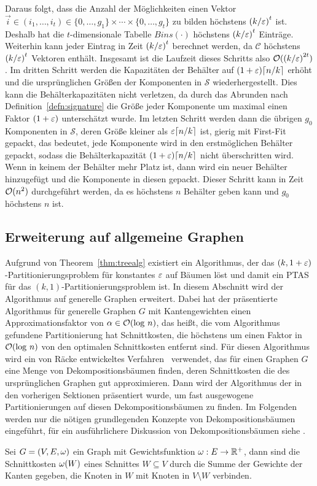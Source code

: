 Daraus folgt, dass die Anzahl der Möglichkeiten einen Vektor $\vec{i} \in (i_1, \ldots, i_t) \in \{0, \ldots, g_1\} \times \cdots \times \{0, \ldots, g_t\}$ zu bilden höchstens ${(k/\varepsilon)}^t$ ist.
Deshalb hat die $t$-dimensionale Tabelle $Bins(\cdot)$ höchstens ${(k/\varepsilon)}^t$ Einträge. 
Weiterhin kann jeder Eintrag in Zeit ${(k/\varepsilon)}^t$ berechnet werden, da $\mathcal{C}$ höchstens ${(k/\varepsilon)}^t$ Vektoren enthält.
Insgesamt ist die Laufzeit dieses Schritts also $\mathcal{O}({(k/\varepsilon)}^{2t})$.
Im dritten Schritt werden die Kapazitäten der Behälter auf $(1 + \eps) \ceil*{n/k}$ erhöht und die ursprünglichen Größen der Komponenten in $\mathcal{S}$ wiederhergestellt.
Dies kann die Behälterkapazitäten nicht verletzen, da durch das Abrunden nach Definition~\ref{defn:signature} die Größe jeder Komponente um maximal  einen Faktor $(1 + \varepsilon)$ unterschätzt wurde.
Im letzten Schritt werden dann die übrigen $g_0$ Komponenten in $\mathcal{S}$, deren Größe kleiner als $\eps \ceil*{n/k}$ ist, gierig mit First-Fit gepackt, das bedeutet, jede Komponente wird in den erstmöglichen Behälter gepackt, sodass die Behälterkapazität $(1 + \eps) \ceil*{n/k}$ nicht überschritten wird.
Wenn in keinem der Behälter mehr Platz ist, dann wird ein neuer Behälter hinzugefügt und die Komponente in diesen gepackt.
Dieser Schritt kann in Zeit  $\mathcal{O}(n^2)$ durchgeführt werden, da es höchstens $n$ Behälter geben kann und $g_0$ höchstens $n$ ist.

\subsection{Erweiterung auf allgemeine Graphen}
Aufgrund von Theorem~\ref{thm:treealg} existiert ein Algorithmus, der das $(k,1+\varepsilon)$-Partitionierungsproblem für konstantes $\varepsilon$ auf Bäumen löst und damit ein PTAS für das $(k,1)$-Partitionierungsproblem ist.
In diesem Abschnitt wird der Algorithmus auf generelle Graphen erweitert.
Dabei hat der präsentierte Algorithmus für generelle Graphen $G$ mit Kantengewichten einen Approximationsfaktor von $\alpha \in \mathcal{O}(\log \, n)$, das heißt, die vom Algorithmus gefundene Partitionierung hat Schnittkosten, die höchstens um einen Faktor in $\mathcal{O}(\log \, n)$ von den optimalen Schnittkosten entfernt sind.
Für diesen Algorithmus wird ein von Räcke entwickeltes Verfahren~\parencite{rc08} verwendet, das für einen Graphen $G$ eine Menge von Dekompositionsbäumen finden, deren Schnittkosten die des ursprünglichen Graphen gut approximieren. 
Dann wird der Algorithmus der in den vorherigen Sektionen präsentiert wurde, um fast ausgewogene Partitionierungen auf diesen Dekompositionsbäumen zu finden.
Im Folgenden werden nur die nötigen grundlegenden Konzepte von Dekompositionsbäumen eingeführt, für ein ausführlichere Diskussion von Dekompositionsbäumen siehe \parencite{rc08, ma10, ws11}.

Sei $G = (V, E, \omega)$ ein Graph mit Gewichtsfunktion $\omega : E \rightarrow \mathbb{R}^+$, dann sind die Schnittkosten $\omega(W)$ eines Schnittes $W \subseteq V$ durch die Summe der Gewichte der Kanten gegeben, die Knoten in $W$ mit Knoten in $V \setminus W$ verbinden.
